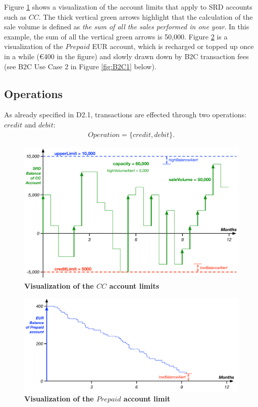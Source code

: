 Figure \ref{fig:accountLimitsCC} shows a visualization of the account limits that apply to SRD accounts such as $CC$. The thick vertical green arrows highlight that the calculation of the sale volume is defined as \emph{the sum of all the sales performed in one year}. In this example, the sum of all the vertical green arrows is 50,000. Figure \ref{fig:accountLimitsPrepaid} is a visualization of the $Prepaid$ EUR account, which is recharged or topped up once in a while (\euro 400 in the figure) and slowly drawn down by B2C transaction fees (see B2C Use Case 2 in Figure \ref{fig:B2C1} below).

\subsection{Operations}
As already specified in D2.1, transactions are effected through two operations: $credit$ and $debit$:
\begin{align}
Operation = \{ credit, debit \}.
\end{align}

\begin{figure}[h]
\vspace{-1cm}
\centering
\includegraphics[width=15cm]{Figures/Account_Limits_CC}
\caption{\small\textbf{Visualization of the $CC$ account limits}}
\label{fig:accountLimitsCC}
\vspace{-0.6cm}
\end{figure}


\begin{figure}[htbp]
\vspace{-0.6cm}
\centering
\includegraphics[width=15.6cm]{Figures/Account_Limits_Prepaid}
\caption{\small\textbf{Visualization of the $Prepaid$ account limit}}
\label{fig:accountLimitsPrepaid}
\vspace{-0.5cm}
\end{figure}


